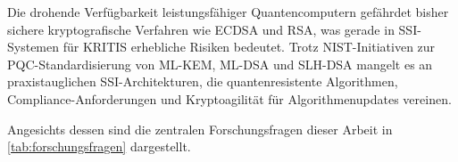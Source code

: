 Die drohende Verfügbarkeit leistungsfähiger Quantencomputern gefährdet bisher sichere kryptografische Verfahren wie \ac{ECDSA} und \ac{RSA}, was gerade in \ac{SSI}-Systemen für \ac{KRITIS} erhebliche Risiken bedeutet. Trotz \ac{NIST}-Initiativen zur \ac{PQC}-Standardisierung von ML-KEM, ML-DSA und SLH-DSA \parencite{nationalinstituteofstandardsandtechnologyus_ModulelatticebasedKeyencapsulationMechanismstandard_2024,nationalinstituteofstandardsandtechnologyus_ModulelatticebasedDigitalSignaturestandard_2024,nationalinstituteofstandardsandtechnologyus_StatelessHashbasedDigitalsignaturestandard_2024} mangelt es an praxistauglichen \ac{SSI}-Architekturen, die quantenresistente Algorithmen, Compliance-Anforderungen \parencite{bundesamtfuersicherheitinderinformationstechnikbsi_KryptographischeVerfahrenEmpfehlungenundSchluessellaengenTeil2VerwendungTransportLayerSecurityTLS_2025} und \gls{Kryptoagilität} für Algorithmenupdates vereinen.

\pagebreak

Angesichts dessen sind die zentralen Forschungsfragen dieser Arbeit in \autoref{tab:forschungsfragen} dargestellt.

